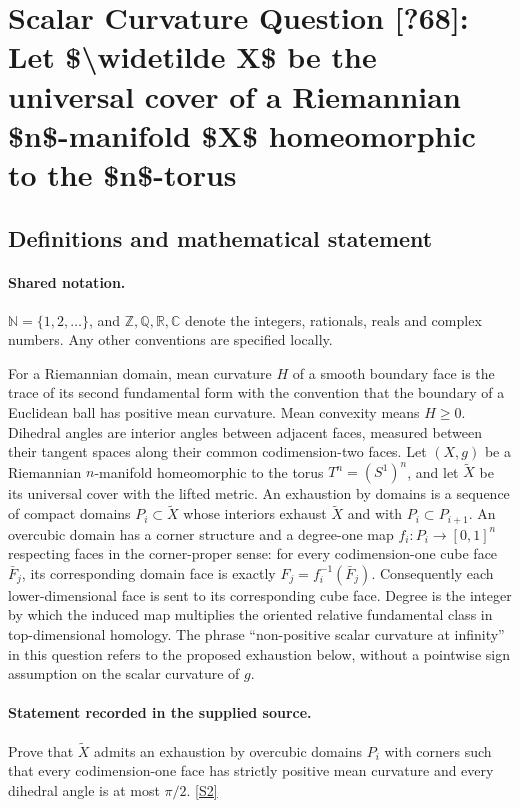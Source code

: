 \documentclass[11pt]{article}
\newcommand{\sref}[2]{\hyperlink{source:#1:#2}{[S#2]}}
\begin{document}
\section{Scalar Curvature Question [?68]: Let \$\textbackslash{}widetilde X\$ be the universal cover of a Riemannian \$n\$-manifold \$X\$ homeomorphic to the \$n\$-torus}\label{statement}

\subsection{Definitions and mathematical statement}

\paragraph{Shared notation.}$\mathbb N=\{1,2,\ldots\}$, and $\mathbb Z,\mathbb Q,\mathbb R,\mathbb C$ denote the integers, rationals, reals and complex numbers. Any other conventions are specified locally.


For a Riemannian domain, mean curvature $H$ of a smooth boundary face is the trace of its second fundamental form with the convention that the boundary of a Euclidean ball has positive mean curvature. Mean convexity means $H\geq0$. Dihedral angles are interior angles between adjacent faces, measured between their tangent spaces along their common codimension-two faces. Let $(X,g)$ be a Riemannian $n$-manifold homeomorphic to the torus $T^n=(S^1)^n$, and let $\widetilde X$ be its universal cover with the lifted metric. An exhaustion by domains is a sequence of compact domains $P_i\subset\widetilde X$ whose interiors exhaust $\widetilde X$ and with $P_i\subset P_{i+1}$. An overcubic domain has a corner structure and a degree-one map $f_i:P_i\to[0,1]^n$ respecting faces in the corner-proper sense: for every codimension-one cube face $\bar F_j$, its corresponding domain face is exactly $F_j=f_i^{-1}(\bar F_j)$. Consequently each lower-dimensional face is sent to its corresponding cube face. Degree is the integer by which the induced map multiplies the oriented relative fundamental class in top-dimensional homology. The phrase ``non-positive scalar curvature at infinity'' in this question refers to the proposed exhaustion below, without a pointwise sign assumption on the scalar curvature of $g$.
\paragraph{Statement recorded in the supplied source.}
Prove that $\widetilde X$ admits an exhaustion by overcubic domains $P_i$ with corners such that every codimension-one face has strictly positive mean curvature and every dihedral angle is at most $\pi/2$. \sref{statement}{2}
\end{document}
